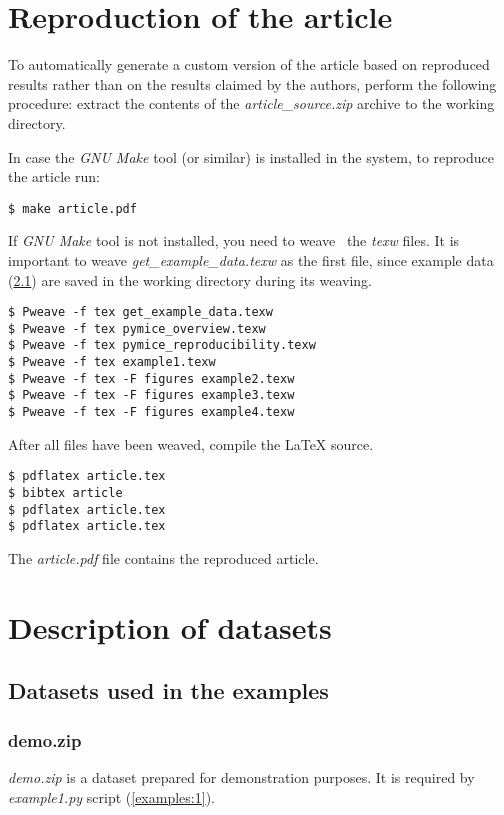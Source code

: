\section{Reproduction of the article}
\label{reproduction}
To automatically generate a custom version of the article based on reproduced
results rather than on the results claimed by the authors, perform the following
procedure: extract the contents of the
\emph{article\_source.zip} archive to the working directory.

In case the \emph{GNU Make} tool (or similar) is installed in the system, to
reproduce the article run:
\begin{verbatim}
$ make article.pdf
\end{verbatim}

If \emph{GNU Make} tool is not installed, you need to weave~\cite{literateProgramming}
the \emph{texw} files.
It is important to weave \emph{get\_example\_data.texw} as the first file,
since example data (\ref{data:examples}) are saved in the working directory
during its weaving.

\begin{verbatim}
$ Pweave -f tex get_example_data.texw
$ Pweave -f tex pymice_overview.texw
$ Pweave -f tex pymice_reproducibility.texw
$ Pweave -f tex example1.texw
$ Pweave -f tex -F figures example2.texw
$ Pweave -f tex -F figures example3.texw
$ Pweave -f tex -F figures example4.texw
\end{verbatim}

After all files have been weaved, compile the \LaTeX{} source.

\begin{verbatim}
$ pdflatex article.tex
$ bibtex article
$ pdflatex article.tex
$ pdflatex article.tex
\end{verbatim}

The \emph{article.pdf} file contains the reproduced article.


\section{Description of datasets}
\subsection{Datasets used in the examples}
\label{data:examples}


\subsubsection{demo.zip}
\label{data:examples:demo}
\emph{demo.zip} is a dataset prepared for demonstration purposes.
It is required by \emph{example1.py} script (\ref{examples:1}).


